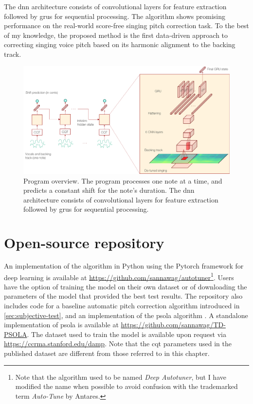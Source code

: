 The \gls{dnn} architecture consists of convolutional layers for feature extraction followed by \gls{gru}s for sequential processing. The algorithm shows promising performance on the real-world score-free singing pitch correction task. To the best of my knowledge, the proposed method is the first data-driven approach to correcting singing voice pitch based on its harmonic alignment to the backing track.

\begin{figure}[t!]
    \centering
    \includegraphics[width=\columnwidth]{images/model_outline.png}
    \caption{Program overview. The program processes one note at a time, and predicts a constant shift for the note's duration. The \gls{dnn} architecture consists of convolutional layers for feature extraction followed by \gls{gru}s for sequential processing.}
    \label{fig:model_outline}
\end{figure}

\section{Open-source repository}
An implementation of the algorithm in Python using the Pytorch framework for deep learning is available at \url{https://github.com/sannawag/autotuner}\footnote{Note that the algorithm used to be named \textit{Deep Autotuner}, but I have modified the name when possible to avoid confusion with the trademarked term \textit{Auto-Tune} by Antares.}. Users have the option of training the model on their own dataset or of downloading the parameters of the model that provided the best test results. The repository also includes code for a baseline automatic pitch correction algorithm introduced in \ref{sec:subjective-test}, and an implementation of the \gls{psola} algorithm \cite{charpentier1986diphone}. A standalone implementation of \gls{psola} is available at \url{https://github.com/sannawag/TD-PSOLA}. The dataset used to train the model is available upon request via \url{https://ccrma.stanford.edu/damp}. Note that the \gls{cqt} parameters used in the published dataset are different from those referred to in this chapter.

